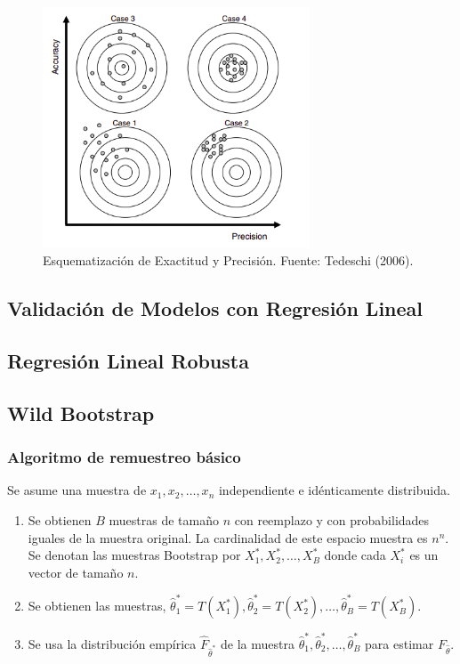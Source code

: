 \begin{figure}[ht]
	\centering
	\includegraphics[width=300px]{img/tadeshi_casos.png}
	\caption{Esquematización de Exactitud y Precisión. Fuente: Tedeschi (2006).}
	\label{fig:etiqueta}
\end{figure}

\subsection{Validación de Modelos con Regresión Lineal}


\subsection{Regresión Lineal Robusta}
\subsection{Wild Bootstrap}

\subsubsection{Algoritmo de remuestreo básico}

Se asume una muestra de $ x_{1}, x_{2},  \dots,  x_{n}$ independiente e idénticamente distribuida.

\begin{enumerate}
		\item Se obtienen $B$ muestras de tamaño $n$ con reemplazo y con probabilidades iguales de la muestra original. La cardinalidad de este espacio muestra es $n^{n}$. Se denotan las muestras Bootstrap por $X^{*}_{1}, X^{*}_{2},  \dots, X^{*}_{B}$ donde cada $X^{*}_{i}$ es un vector de tamaño $n$.
		
		\item Se obtienen las muestras, $\hat{\theta}^{*}_{1} = T (X^{*}_{1}) , \hat{\theta}^{*}_{2} = T (X^{*}_{2}), \dots,\hat{\theta}^{*}_{B} = T (X^{*}_{B})$.
		
		\item Se usa la distribución empírica $\hat{F}_{\hat{\theta}^{*}}$ de la muestra $\hat{\theta}^{*}_{1},\hat{\theta}^{*}_{2},  \dots, \hat{\theta}^{*}_{B}$ para estimar $F_{\hat{\theta}} $.
\end{enumerate}

